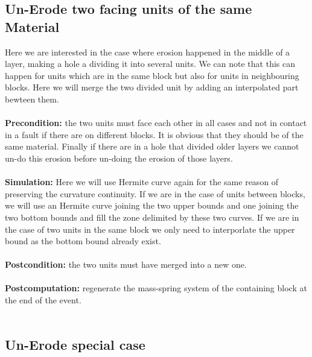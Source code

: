 \documentclass[12pt, a4paper]{memoir} %
\begin{document}
\subsection{Un-Erode two facing units of the same Material}

Here we are interested in the case where erosion happened in the middle of a layer, making a hole a dividing it into several units. We can note that this can happen for units which are in the same block but also for units in neighbouring blocks. Here we will merge the two divided unit by adding an interpolated part bewteen them.\\\\
\textbf{Precondition:} the two units must face each other in all cases and not in contact in a fault if there are on different blocks. It is obvious that they should be of the same material. Finally if there are in a hole that divided older layers we cannot un-do this erosion before un-doing the erosion of those layers.\\\\
\textbf{Simulation:} Here we will use Hermite curve again for the same reason of preserving the curvature continuity. If we are in the case of units between blocks, we will use an Hermite curve joining the two upper bounds and one joining the two bottom bounds and fill the zone delimited by these two curves. If we are in the case of two units in the same block we only need to interporlate the upper bound as the bottom bound already exist.\\\\
\textbf{Postcondition:} the two units must have merged into a new one.\\\\
\textbf{Postcomputation:} regenerate the mass-spring system of the containing block at the end of the event.\\\\
\subsection{Un-Erode special case}
\end{document}

